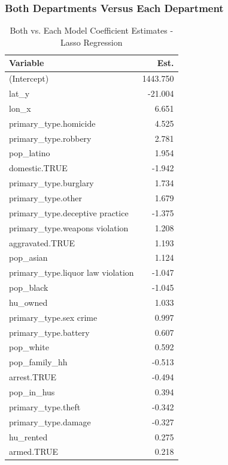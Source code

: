 \documentclass{ucetd}
\begin{document}
\hypertarget{both-departments-versus-each-department}{%
\subsubsection{Both Departments Versus Each
Department}\label{both-departments-versus-each-department}}

\begin{table}

\caption{\label{tab:both-lasso}Both vs. Each Model Coefficient Estimates - Lasso Regression}
\centering
\begin{tabular}[t]{l|r}
\hline
Variable & Est.\\
\hline
(Intercept) & 1443.750\\
\hline
lat\_y & -21.004\\
\hline
lon\_x & 6.651\\
\hline
primary\_type.homicide & 4.525\\
\hline
primary\_type.robbery & 2.781\\
\hline
pop\_latino & 1.954\\
\hline
domestic.TRUE & -1.942\\
\hline
primary\_type.burglary & 1.734\\
\hline
primary\_type.other & 1.679\\
\hline
primary\_type.deceptive practice & -1.375\\
\hline
primary\_type.weapons violation & 1.208\\
\hline
aggravated.TRUE & 1.193\\
\hline
pop\_asian & 1.124\\
\hline
primary\_type.liquor law violation & -1.047\\
\hline
pop\_black & -1.045\\
\hline
hu\_owned & 1.033\\
\hline
primary\_type.sex crime & 0.997\\
\hline
primary\_type.battery & 0.607\\
\hline
pop\_white & 0.592\\
\hline
pop\_family\_hh & -0.513\\
\hline
arrest.TRUE & -0.494\\
\hline
pop\_in\_hus & 0.394\\
\hline
primary\_type.theft & -0.342\\
\hline
primary\_type.damage & -0.327\\
\hline
hu\_rented & 0.275\\
\hline
armed.TRUE & 0.218\\

\end{tabular}
\end{table}
\end{document}
